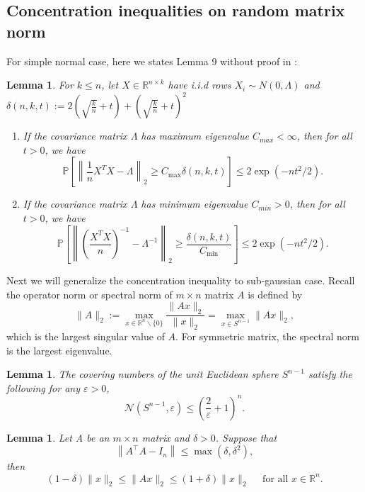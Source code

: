 \documentclass[12pt]{article}
\numberwithin{equation}{section}
\newtheorem{lemma}[theorem]{Lemma}
\begin{document}
\subsection{Concentration inequalities on random matrix norm}
For simple normal case, here we states Lemma 9 without proof in \citet{wainwright2009sharp}:
\begin{lemma}
	For $k\leq n$, let $X\in \mathbb{R}^{n\times k}$ have i.i.d rows $X_{i} \sim N(0, \Lambda)$ and $\delta(n, k, t):=2(\sqrt{\frac{k}{n}}+t)+(\sqrt{\frac{k}{n}}+t)^{2}$
	\begin{enumerate}
		\item If the covariance matrix $\Lambda$ has maximum eigenvalue $C_{max}<\infty$, then for all $t>0$, we have
		\begin{equation}
		\mathbb{P}\left[\left\|\frac{1}{n} X^{T} X-\Lambda\right\|_{2} \geq C_{\max } \delta(n, k, t)\right] \leq 2 \exp \left(-n t^{2} / 2\right).
		\end{equation}
		\item If the covariance matrix $\Lambda$ has minimum eigenvalue $C_{min}>0$, then for all $t>0$, we have
		\begin{equation}
		\mathbb{P}\left[\left\|\left(\frac{X^{T} X}{n}\right)^{-1}-\Lambda^{-1}\right\|_{2} \geq \frac{\delta(n, k, t)}{C_{\min }}\right] \leq 2 \exp \left(-n t^{2} / 2\right).
		\end{equation}
	\end{enumerate}
\end{lemma}
Next we will generalize the concentration inequality to sub-gaussian case. Recall the operator norm or spectral norm of $m\times n$ matrix $A$ is defined by
$$
\|A\|_2:=\max _{x \in \mathbb{R}^{n} \backslash\{0\}} \frac{\|A x\|_{2}}{\|x\|_{2}}=\max _{x \in S^{n-1}}\|A x\|_{2},
$$
which is the largest singular value of $A$. For symmetric matrix, the spectral norm is the largest eigenvalue. 
\begin{lemma}\label{lemma1.2}
	The covering numbers of the unit Euclidean sphere $S^{n-1}$ satisfy the following for any $\varepsilon>0$,
	$$
	\mathcal{N}\left(S^{n-1}, \varepsilon\right) \leq\left(\frac{2}{\varepsilon}+1\right)^{n}.
	$$
\end{lemma}
\begin{lemma}\label{lemma1.3}
	Let A be an $m\times n$ matrix and $\delta>0$. Suppose that
	$$
	\left\|A^{\top} A-I_{n}\right\| \leq \max \left(\delta, \delta^{2}\right),
	$$
	then 
	$$
	(1-\delta)\|x\|_{2} \leq\|A x\|_{2} \leq(1+\delta)\|x\|_{2} \quad \text { for all } x \in \mathbb{R}^{n}.
	$$
\end{lemma}
\end{document}

